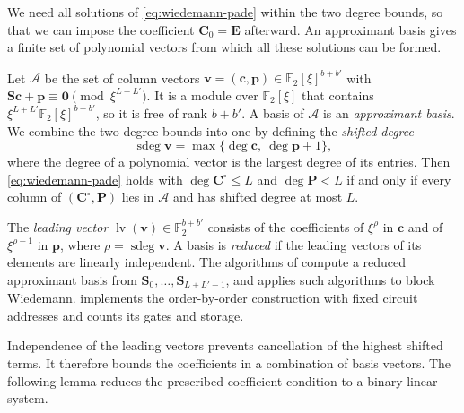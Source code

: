 \documentclass[b5paper, 10pt, abstract=true, captions=tableheading]{scrartcl}
\theoremstyle{plain}
\theoremstyle{definition}
\newcommand{\FF}{\mathds{F}}
\renewcommand{\vec}[1]{\symbf{#1}}
\newcommand{\mat}[1]{\symbf{#1}}
\begin{document}
We need all solutions of \eqref{eq:wiedemann-pade} within the two degree
bounds, so that we can impose the coefficient $\mat C_0=\mat E$ afterward.
An approximant basis gives a finite set of polynomial vectors from which
all these solutions can be formed.

Let $\mathcal A$ be the set of column vectors
$\vec v=(\vec c,\vec p)\in\FF_2[\xi]^{b+b'}$ with
$\mat S\vec c+\vec p\equiv\vec0\pmod{\xi^{L+L'}}$. It is a module over
$\FF_2[\xi]$ that contains $\xi^{L+L'}\FF_2[\xi]^{b+b'}$, so it is free of
rank $b+b'$. A basis of $\mathcal A$ is an \emph{approximant basis}. We
combine the two degree bounds into one by defining the \emph{shifted degree}
\[
  \operatorname{sdeg}\vec v=\max\{\deg\vec c,\ \deg\vec p+1\},
\]
where the degree of a polynomial vector is the largest degree of its
entries. Then \eqref{eq:wiedemann-pade} holds with $\deg\mat C^\circ\leq L$
and $\deg\mat P<L$ if and only if every column of
$(\mat C^\circ,\mat P)$ lies in $\mathcal A$ and has shifted degree at
most $L$.

The \emph{leading vector} $\operatorname{lv}(\vec v)\in
\FF_2^{b+b'}$ consists of the coefficients of $\xi^{\rho}$ in $\vec c$
and of $\xi^{\rho-1}$ in $\vec p$, where
$\rho=\operatorname{sdeg}\vec v$. A basis is \emph{reduced} if the
leading vectors of its elements are linearly independent. The algorithms
of \cite{BeckermannLabahn1994,GiorgiJeannerodVillard2003} compute a reduced
approximant basis from $\mat S_0,\ldots,\mat S_{L+L'-1}$, and
\cite{Thome2002} applies such algorithms to block Wiedemann.
 implements the order-by-order construction
with fixed circuit addresses and counts its gates and storage.

Independence of the leading vectors prevents cancellation of the highest
shifted terms. It therefore bounds the coefficients in a combination of
basis vectors. The following lemma reduces the prescribed-coefficient
condition to a binary linear system.
\end{document}
